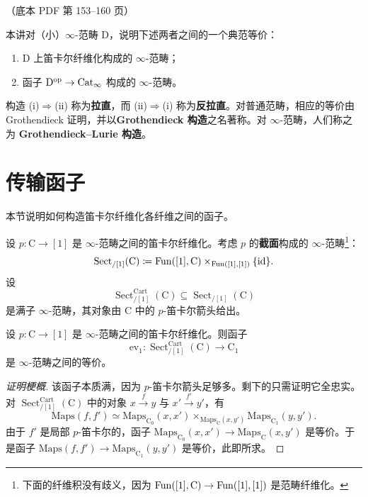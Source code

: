 \begin{center}\small\color{black!55}（底本 PDF 第 153–160 页）\end{center}

本讲对（小）$\infty$-范畴 $\mathrm{D}$，说明下述两者之间的一个典范等价：
\begin{enumerate}[label=(\roman*),leftmargin=2.4em,itemsep=0.1em]
\item $\mathrm{D}$ 上笛卡尔纤维化构成的 $\infty$-范畴；
\item 函子 $\mathrm{D}^{\mathrm{op}}\to\operatorname{Cat}_\infty$ 构成的 $\infty$-范畴。
\end{enumerate}
构造 (i)$\Rightarrow$(ii) 称为\textbf{拉直}，而 (ii)$\Rightarrow$(i) 称为\textbf{反拉直}。对普通范畴，相应的等价由 Grothendieck 证明，并以\textbf{Grothendieck 构造}之名著称。对 $\infty$-范畴，人们称之为 \textbf{Grothendieck–Lurie 构造}。


\section{传输函子}

\nitem\label{L20-1.1} 本节说明如何构造笛卡尔纤维化各纤维之间的函子。

设 $p\colon \mathrm{C}\to[1]$ 是 $\infty$-范畴之间的笛卡尔纤维化。考虑 $p$ 的\textbf{截面}构成的 $\infty$-范畴\footnote{下面的纤维积没有歧义，因为 $\operatorname{Fun}([1],\mathrm{C})\to\operatorname{Fun}([1],[1])$ 是范畴纤维化。}：
\[
\operatorname{Sect}_{/[1]}(\mathrm{C})\coloneqq \operatorname{Fun}([1],\mathrm{C})\times_{\operatorname{Fun}([1],[1])}\{\operatorname{id}\}.
\]
设
\[
\operatorname{Sect}^{\mathrm{Cart}}_{/[1]}(\mathrm{C})\subseteq\operatorname{Sect}_{/[1]}(\mathrm{C})
\]
是满子 $\infty$-范畴，其对象由 $\mathrm{C}$ 中的 $p$-笛卡尔箭头给出。

\begin{proposition}\label{L20-1.2}
设 $p\colon \mathrm{C}\to[1]$ 是 $\infty$-范畴之间的笛卡尔纤维化。则函子
\[
\mathrm{ev}_1\colon \operatorname{Sect}^{\mathrm{Cart}}_{/[1]}(\mathrm{C})\to\mathrm{C}_1
\]
是 $\infty$-范畴之间的等价。
\end{proposition}

\begin{proof}[证明梗概]
该函子本质满，因为 $p$-笛卡尔箭头足够多。剩下的只需证明它全忠实。对 $\operatorname{Sect}^{\mathrm{Cart}}_{/[1]}(\mathrm{C})$ 中的对象 $x\xrightarrow{f}y$ 与 $x'\xrightarrow{f'}y'$，有
\[
\mathrm{Maps}(f,f')\simeq \mathrm{Maps}_{\mathrm{C}_0}(x,x')\times_{\mathrm{Maps}_{\mathrm{C}}(x,y')}\mathrm{Maps}_{\mathrm{C}_1}(y,y').
\]
由于 $f'$ 是局部 $p$-笛卡尔的，函子 $\mathrm{Maps}_{\mathrm{C}_0}(x,x')\to\mathrm{Maps}_{\mathrm{C}}(x,y')$ 是等价。于是函子 $\mathrm{Maps}(f,f')\to\mathrm{Maps}_{\mathrm{C}_1}(y,y')$ 是等价，此即所求。
\end{proof}

